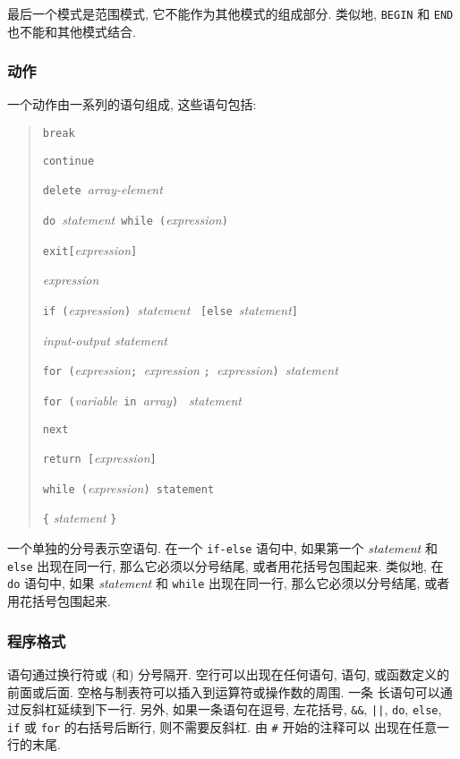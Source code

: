 最后一个模式是范围模式, 它不能作为其他模式的组成部分. 类似地,
\texttt{BEGIN} 和 \texttt{END} 也不能和其他模式结合.
\subsubsection{动作}
一个动作由一系列的语句组成, 这些语句包括:
\begin{quote}
    \texttt{break}

    \texttt{continue}

    \texttt{delete}\ \textit{array-element}

    \texttt{do}\ \textit{statement}\ \texttt{while}\
    \texttt{(}\textit{expression}\texttt{)}

    \texttt{exit[}\textit{expression}\texttt{]}

    \textit{expression}

    \texttt{if (}\textit{expression}\texttt{) }\textit{statement}
    \ \texttt{[else}\ \textit{statement}\texttt{]}

    \textit{input-output statement}

    \texttt{for (}\textit{expression}\texttt{; }\textit{expression}
    \texttt{; }\textit{expression}\texttt{) }\textit{statement}

    \texttt{for (}\textit{variable}\texttt{ in }\textit{array}\texttt{) }
    \textit{statement}

    \texttt{next}

    \texttt{return [}\textit{expression}\texttt{]}

    \texttt{while (}\textit{expression}\texttt{) statement}

    \verb'{' \textit{statement} \verb'}'
\end{quote}
一个单独的分号表示空语句. 在一个 \texttt{if-else} 语句中, 如果第一个 
\textit{statement} 和 \texttt{else} 出现在同一行, 那么它必须以分号结尾,
或者用花括号包围起来. 类似地, 在 \texttt{do} 语句中, 如果
\textit{statement} 和 \texttt{while} 出现在同一行, 那么它必须以分号结尾,
或者用花括号包围起来.

\subsubsection{程序格式}
语句通过换行符或 (和) 分号隔开. 空行可以出现在任何语句, \patact 语句,
或函数定义的前面或后面. 空格与制表符可以插入到运算符或操作数的周围. 一条
长语句可以通过反斜杠延续到下一行. 另外, 如果一条语句在逗号, 左花括号,
\verb'&&', \verb'||', \texttt{do}, \texttt{else}, \texttt{if} 或 
\texttt{for} 的右括号后断行, 则不需要反斜杠. 由 \verb'#' 开始的注释可以
出现在任意一行的末尾.

